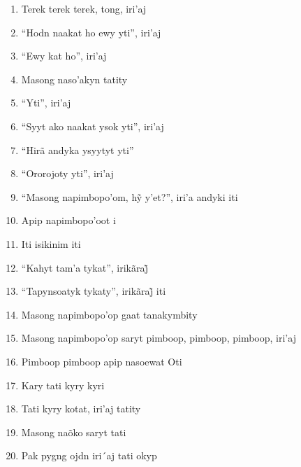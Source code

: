 \begin{enumerate}
 \item Terek terek terek, tong, iri'aj

 \item ``Hodn naakat ho ewy yti'', iri'aj

 \item ``Ewy kat ho'', iri'aj

 \item Masong naso'akyn tatity

 \begin{center}\end{center}

 \item ``Yti'', iri'aj

 \item ``Syyt ako naakat ysok yti'', iri'aj

 \item ``Hirã andyka ysyytyt yti''

 \item ``Ororojoty yti'', iri'aj

 \item ``Masong napimbopo’om, hỹ y’et?'', iri’a andyki iti

 \item Apip napimbopo'oot i

 \item Iti isikinim iti

 \item ``Kahyt tam’a tykat'', irikãraj̃

 \item ``Tapynsoatyk tykaty'', irikãraj̃ iti

 \item Masong napimbopo'op gaat tanakymbity

 \item Masong napimbopo'op saryt pimboop, pimboop, pimboop, iri'aj

 \item Pimboop pimboop apip nasoewat Oti

 \item Kary tati kyry kyri

 \item Tati kyry kotat, iri'aj tatity

 \begin{center}\end{center}

 \item Masong naõko saryt tati

 \item Pak pygng ojdn iri´aj tati okyp


\end{enumerate}
